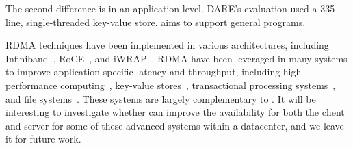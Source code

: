 % 
% 

The second difference is in an application level. DARE's evaluation used a 
335-line, single-threaded key-value store. \xxx aims to support general 
programs.





 RDMA techniques have been implemented in various 
architectures, including Infiniband~\cite{infiniband}, RoCE~\cite{roce}, and 
iWRAP~\cite{iwrap}. RDMA have been leveraged in many systems to improve 
application-specific latency and throughput, including high performance 
computing~\cite{openmpi}, key-value 
stores~\cite{pilaf:usenix14,herd:sigcomm14,farm:nsdi14,memcached:rdma}, 
transactional processing systems~\cite{drtm:sosp15,farm:sosp15}, and file 
systems~\cite{gibson:nfs}. These systems are largely complementary to \xxx. It 
will be interesting to investigate whether \xxx can improve the availability for 
both the client and server for some of these advanced systems within a 
datacenter, and we leave it for future work.

